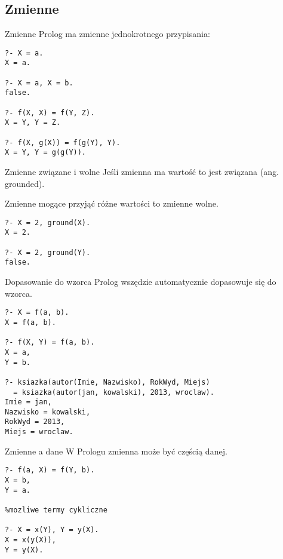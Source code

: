 \documentclass[blue]{beamer}
\begin{document}
\subsection{Zmienne}
\begin{frame}[fragile]{Zmienne}
Prolog ma zmienne jednokrotnego przypisania:
\begin{lstlisting}
?- X = a.
X = a.

?- X = a, X = b.
false.

?- f(X, X) = f(Y, Z).
X = Y, Y = Z.

?- f(X, g(X)) = f(g(Y), Y).
X = Y, Y = g(g(Y)).
\end{lstlisting}
\end{frame}
\begin{frame}[fragile]{Zmienne związane i wolne}
Jeśli zmienna ma wartość to jest związana (ang. grounded).

Zmienne mogące przyjąć różne wartości to zmienne wolne.
\begin{lstlisting}
?- X = 2, ground(X).
X = 2.

?- X = 2, ground(Y).
false.
\end{lstlisting}
\end{frame}
\begin{frame}[fragile]{Dopasowanie do wzorca}
Prolog wszędzie automatycznie dopasowuje się do wzorca.
\begin{lstlisting}
?- X = f(a, b).
X = f(a, b).

?- f(X, Y) = f(a, b).
X = a,
Y = b.

?- ksiazka(autor(Imie, Nazwisko), RokWyd, Miejs)
  = ksiazka(autor(jan, kowalski), 2013, wroclaw).
Imie = jan,
Nazwisko = kowalski,
RokWyd = 2013,
Miejs = wroclaw.
\end{lstlisting}
\end{frame}
\begin{frame}[fragile]{Zmienne a dane}
W Prologu zmienna może być częścią danej.
\begin{lstlisting}
?- f(a, X) = f(Y, b).
X = b,
Y = a.

%mozliwe termy cykliczne

?- X = x(Y), Y = y(X).
X = x(y(X)),
Y = y(X).
\end{lstlisting}
\end{frame}
\end{document}
